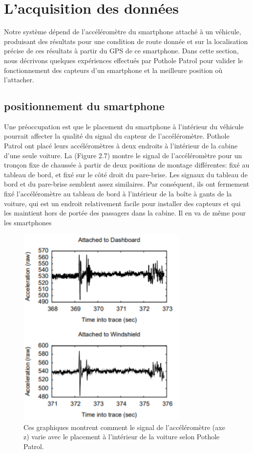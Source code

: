   
  \section{L'acquisition des données}
  Notre système dépend de l'accéléromètre du smartphone attaché à un véhicule, produisant des résultats pour une condition de route donnée et sur la localisation précise de ces résultats à partir du GPS de ce smartphone.
Dans cette section, nous décrivons quelques expériences effectués par Pothole Patrol \cite{PDFPotholePatrol} pour valider le fonctionnement des capteurs d'un smartphone et la meilleure position où l'attacher.
\subsection{positionnement du smartphone}
Une préoccupation est que le placement du smartphone à l'intérieur du véhicule pourrait affecter la qualité du signal du capteur de l'accéléromètre. Pothole Patrol ont placé leurs accéléromètres à deux endroits à l'intérieur de la cabine d'une seule voiture. La (Figure 2.7) montre le signal de l'accéléromètre pour un tronçon fixe de chaussée à partir de deux positions de montage différentes: fixé au tableau de bord, et fixé sur le côté droit du pare-brise. Les signaux du tableau de bord et du pare-brise semblent assez similaires. \newline
  Par conséquent, ils ont fermement fixé l’accéléromètre au tableau de bord à l’intérieur de la boîte à gants de la voiture, qui est un endroit relativement facile pour installer des capteurs et qui les maintient hors de portée des passagers dans la cabine. Il en va de même pour les smartphones
  \begin{figure}[h!]
    \center
    \includegraphics[width=0.75\textwidth]{Images/chapter2/positionmnt.PNG}
   \caption{Ces graphiques montrent comment le signal de l'accéléromètre (axe z) varie avec le placement à l'intérieur de la voiture selon Pothole Patrol.}
   \label{fig:smartphonePosition}
    \end{figure}


